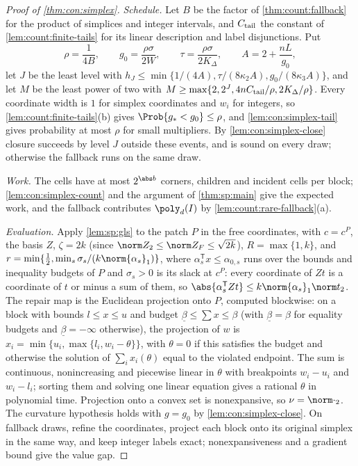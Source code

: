 \begin{proof}[Proof of \cref{thm:con:simplex}]
\emph{Schedule.} Let $B$ be the factor of \cref{thm:count:fallback} for the
product of simplices and integer intervals, and $C_{\rm tail}$ the constant of
\cref{lem:count:finite-tails} for its linear description and label
disjunctions. Put
\[
 \rho=\frac1{4B},\qquad g_0=\frac{\rho\sigma}{2W},\qquad
 \tau=\frac{\rho\sigma}{2K_\Delta},\qquad A=2+\frac{nL}{g_0},
\]
let $J$ be the least level with
$h_J\le\min\{1/(4A),\tau/(8\kappa_2A),g_0/(8\kappa_3A)\}$, and let $M$ be the
least power of two with $M\ge\max\{2,2^J,4nC_{\rm tail}/\rho,2K_\Delta/\rho\}$.
Every
coordinate width is $1$ for simplex coordinates and $w_i$ for integers, so
\cref{lem:count:finite-tails}(b) gives $\Prob\{g_*<g_0\}\le\rho$, and
\cref{lem:con:simplex-tail} gives probability at most $\rho$ for small
multipliers. By \cref{lem:con:simplex-close} closure succeeds by level $J$
outside these events, and is sound on every draw; otherwise the fallback
runs on the same draw.

\emph{Work.} The cells have at most $2^{\abs b}$ corners, children and
incident cells per block; \cref{lem:con:simplex-count} and the argument of
\cref{thm:sp:main} give the expected work, and the fallback contributes
$\poly_d(I)$ by \cref{lem:count:rare-fallback}(a).

\emph{Evaluation.} Apply \cref{lem:sp:gls} to the patch $P$ in the free
coordinates, with $c=c^P$, the basis $Z$, $\zeta=2k$ (since
$\norm Z_2\le\norm Z_F\le\sqrt{2k}$), $R=\max\{1,k\}$, and
$r=\min\{\frac12,\min_s\sigma_s/(k\norm{\alpha_s}_1)\}$, where $\alpha_s^{\mathsf
T}x\le\alpha_{0,s}$ runs over the bounds and inequality budgets of $P$ and
$\sigma_s>0$ is its slack at $c^P$: every coordinate of $Zt$ is a coordinate of
$t$ or minus a sum of them, so $\abs{\alpha_s^{\mathsf T}Zt}\le
k\norm{\alpha_s}_1\norm t_2$. The repair map is the Euclidean projection onto
$P$, computed blockwise: on a block with bounds $l\le x\le u$ and budget
$\underline\beta\le\sum x\le\beta$ (with $\underline\beta=\beta$ for equality
budgets and $\underline\beta=-\infty$ otherwise), the projection of $w$ is
$x_i=\min\{u_i,\max\{l_i,w_i-\theta\}\}$, with $\theta=0$ if this satisfies
the budget and otherwise the solution of $\sum_ix_i(\theta)$ equal to the
violated endpoint. The sum is continuous, nonincreasing and piecewise linear
in $\theta$ with breakpoints $w_i-u_i$ and $w_i-l_i$; sorting them and solving
one linear equation gives a rational $\theta$ in polynomial time. Projection
onto a convex set is nonexpansive, so $\nu=\norm\cdot_2$. The curvature
hypothesis holds with $g=g_0$ by \cref{lem:con:simplex-close}. On fallback
draws, refine the coordinates, project each block onto its original simplex
in the same way, and keep integer labels exact; nonexpansiveness and a
gradient bound give the value gap.
\end{proof}

